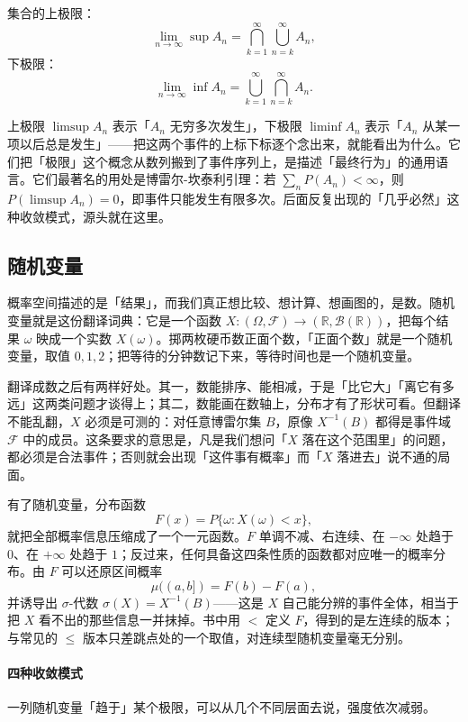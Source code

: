 \documentclass[UTF8]{ctexbook}
\begin{document}
集合的上极限：
\[
\lim_{n\to\infty}\sup A_n=\bigcap_{k=1}^{\infty}\bigcup_{n=k}^{\infty}A_n,
\]
下极限：
\[
\lim_{n\to\infty}\inf A_n=\bigcup_{k=1}^{\infty}\bigcap_{n=k}^{\infty}A_n.
\]

上极限 $\limsup A_n$ 表示「$A_n$ 无穷多次发生」，下极限 $\liminf A_n$ 表示「$A_n$ 从某一项以后总是发生」——把这两个事件的上标下标逐个念出来，就能看出为什么。它们把「极限」这个概念从数列搬到了事件序列上，是描述「最终行为」的通用语言。它们最著名的用处是博雷尔-坎泰利引理：若 $\sum_n P(A_n)<\infty$，则 $P(\limsup A_n)=0$，即事件只能发生有限多次。后面反复出现的「几乎必然」这种收敛模式，源头就在这里。

\subsection{随机变量}

概率空间描述的是「结果」，而我们真正想比较、想计算、想画图的，是数。随机变量就是这份翻译词典：它是一个函数 $X:(\Omega,\mathcal{F})\to(\mathbb{R},\mathcal{B}(\mathbb{R}))$，把每个结果 $\omega$ 映成一个实数 $X(\omega)$。掷两枚硬币数正面个数，「正面个数」就是一个随机变量，取值 $0,1,2$；把等待的分钟数记下来，等待时间也是一个随机变量。

翻译成数之后有两样好处。其一，数能排序、能相减，于是「比它大」「离它有多远」这两类问题才谈得上；其二，数能画在数轴上，分布才有了形状可看。但翻译不能乱翻，$X$ 必须是可测的：对任意博雷尔集 $B$，原像 $X^{-1}(B)$ 都得是事件域 $\mathcal{F}$ 中的成员。这条要求的意思是，凡是我们想问「$X$ 落在这个范围里」的问题，都必须是合法事件；否则就会出现「这件事有概率」而「$X$ 落进去」说不通的局面。

有了随机变量，分布函数
\[
F(x)=P\{\omega:X(\omega)<x\},
\]
就把全部概率信息压缩成了一个一元函数。$F$ 单调不减、右连续、在 $-\infty$ 处趋于 $0$、在 $+\infty$ 处趋于 $1$；反过来，任何具备这四条性质的函数都对应唯一的概率分布。由 $F$ 可以还原区间概率
\[
\mu((a,b])=F(b)-F(a),
\]
并诱导出 $\sigma$-代数 $\sigma(X)=X^{-1}(B)$——这是 $X$ 自己能分辨的事件全体，相当于把 $X$ 看不出的那些信息一并抹掉。书中用 $<$ 定义 $F$，得到的是左连续的版本；与常见的 $\le$ 版本只差跳点处的一个取值，对连续型随机变量毫无分别。

\paragraph{四种收敛模式}

一列随机变量「趋于」某个极限，可以从几个不同层面去说，强度依次减弱。
\end{document}
